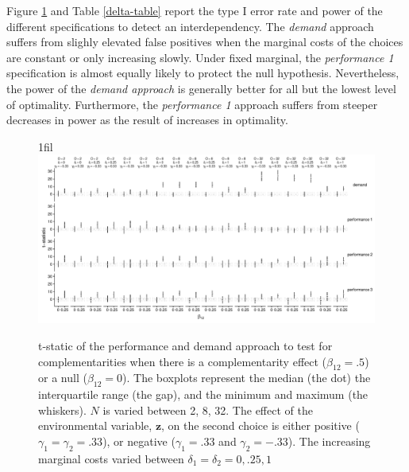 \documentclass[12pt]{article}
\makeatletter
\newcommand*{\centerfloat}{%
  \parindent \z@
  \leftskip \z@ \@plus 1fil \@minus \textwidth
  \rightskip\leftskip
  \parfillskip \z@skip}
\makeatother
\begin{document}
Figure \ref{delta} and Table \ref{delta-table} report the type I error rate and power of the different specifications to detect an interdependency. The \emph{demand} approach suffers from slighly elevated false positives when the marginal costs of the choices are constant or only increasing slowly. Under fixed marginal, the \emph{performance 1} specification is almost equally likely to protect the null hypothesis. Nevertheless, the power of the \emph{demand approach} is generally better for all but the lowest level of optimality. Furthermore, the \emph{performance 1} approach suffers from steeper decreases in power as the result of increases in optimality.

\begin{figure}
\centerfloat
\includegraphics[width=600px]{figure-latex/delta_plot.pdf}
\caption[The Error Rate and Power with Different Levels of Marginal Costs]
{\label{delta} t-static of the performance and demand approach to test
for complementarities when there is a complementarity effect ($\beta_{12} = .5$)
or a null ($\beta_{12} = 0$). The boxplots represent the median (the dot) the
interquartile range (the gap), and the minimum and maximum (the whiskers). $N$
is varied between 2, 8, 32. The effect of the environmental
variable, $\mathbf{z}$, on the second choice is either positive
($\gamma_1 = \gamma_2 = .33$), or negative ($\gamma_1 = .33$ and $\gamma_2 = -.33$).
The increasing marginal costs varied between $\delta_1 = \delta_2 = 0, .25, 1$}
\end{figure}


\end{document}
